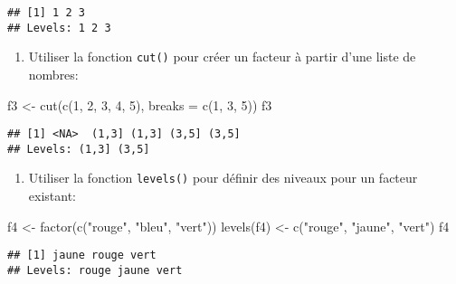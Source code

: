 \documentclass[
]{article}
\newenvironment{Shaded}{\begin{snugshade}}{\end{snugshade}}
\newcommand{\AttributeTok}[1]{\textcolor[rgb]{0.77,0.63,0.00}{#1}}
\newcommand{\DecValTok}[1]{\textcolor[rgb]{0.00,0.00,0.81}{#1}}
\newcommand{\FunctionTok}[1]{\textcolor[rgb]{0.00,0.00,0.00}{#1}}
\newcommand{\NormalTok}[1]{#1}
\newcommand{\OtherTok}[1]{\textcolor[rgb]{0.56,0.35,0.01}{#1}}
\newcommand{\StringTok}[1]{\textcolor[rgb]{0.31,0.60,0.02}{#1}}
\providecommand{\tightlist}{%
  \setlength{\itemsep}{0pt}\setlength{\parskip}{0pt}}
\begin{document}
\begin{verbatim}
## [1] 1 2 3
## Levels: 1 2 3
\end{verbatim}

\begin{enumerate}
\def\labelenumi{\arabic{enumi}.}
\setcounter{enumi}{2}
\tightlist
\item
  Utiliser la fonction \texttt{cut()} pour créer un facteur à partir d'une liste de nombres:
\end{enumerate}

\begin{Shaded}
\begin{Highlighting}[]
\NormalTok{f3 }\OtherTok{\textless{}{-}} \FunctionTok{cut}\NormalTok{(}\FunctionTok{c}\NormalTok{(}\DecValTok{1}\NormalTok{, }\DecValTok{2}\NormalTok{, }\DecValTok{3}\NormalTok{, }\DecValTok{4}\NormalTok{, }\DecValTok{5}\NormalTok{), }\AttributeTok{breaks =} \FunctionTok{c}\NormalTok{(}\DecValTok{1}\NormalTok{, }\DecValTok{3}\NormalTok{, }\DecValTok{5}\NormalTok{))}
\NormalTok{f3}
\end{Highlighting}
\end{Shaded}

\begin{verbatim}
## [1] <NA>  (1,3] (1,3] (3,5] (3,5]
## Levels: (1,3] (3,5]
\end{verbatim}

\begin{enumerate}
\def\labelenumi{\arabic{enumi}.}
\setcounter{enumi}{3}
\tightlist
\item
  Utiliser la fonction \texttt{levels()} pour définir des niveaux pour un facteur existant:
\end{enumerate}

\begin{Shaded}
\begin{Highlighting}[]
\NormalTok{f4 }\OtherTok{\textless{}{-}} \FunctionTok{factor}\NormalTok{(}\FunctionTok{c}\NormalTok{(}\StringTok{"rouge"}\NormalTok{, }\StringTok{"bleu"}\NormalTok{, }\StringTok{"vert"}\NormalTok{))}
\FunctionTok{levels}\NormalTok{(f4) }\OtherTok{\textless{}{-}} \FunctionTok{c}\NormalTok{(}\StringTok{"rouge"}\NormalTok{, }\StringTok{"jaune"}\NormalTok{, }\StringTok{"vert"}\NormalTok{)}
\NormalTok{f4}
\end{Highlighting}
\end{Shaded}

\begin{verbatim}
## [1] jaune rouge vert 
## Levels: rouge jaune vert
\end{verbatim}
\end{document}
